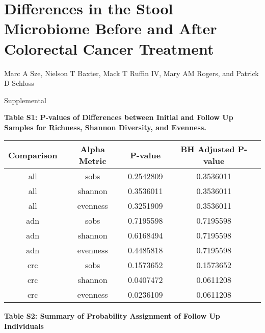 \documentclass[12pt,]{article}
\title{}
\author{}
\date{}
\begin{document}
\section{Differences in the Stool Microbiome Before and After Colorectal
Cancer
Treatment}\label{differences-in-the-stool-microbiome-before-and-after-colorectal-cancer-treatment}

\vspace{10mm}

\begin{center}
Marc A Sze, Nielson T Baxter, Mack T Ruffin IV, Mary AM Rogers, and Patrick D Schloss

\vspace{10mm}

Supplemental
\end{center}

\newpage

\textbf{Table S1: P-values of Differences between Initial and Follow Up
Samples for Richness, Shannon Diversity, and Evenness.}

\begin{longtable}[]{@{}cccc@{}}
\toprule
Comparison & Alpha Metric & P-value & BH Adjusted P-value\tabularnewline
\midrule
\endhead
all & sobs & 0.2542809 & 0.3536011\tabularnewline
all & shannon & 0.3536011 & 0.3536011\tabularnewline
all & evenness & 0.3251909 & 0.3536011\tabularnewline
adn & sobs & 0.7195598 & 0.7195598\tabularnewline
adn & shannon & 0.6168494 & 0.7195598\tabularnewline
adn & evenness & 0.4485818 & 0.7195598\tabularnewline
crc & sobs & 0.1573652 & 0.1573652\tabularnewline
crc & shannon & 0.0407472 & 0.0611208\tabularnewline
crc & evenness & 0.0236109 & 0.0611208\tabularnewline
\bottomrule
\end{longtable}

\newpage

\textbf{Table S2: Summary of Probability Assignment of Follow Up
Individuals}
\end{document}
